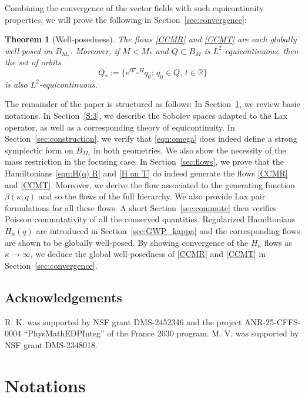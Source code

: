 \documentclass{amsart}
\numberwithin{equation}{section}
\newtheorem{theorem}{Theorem}[section]
\theoremstyle{definition}
\newcommand{\om}{\omega}
\newcommand{\R}{\mathbb{R}}
\newcommand{\na}{\nabla}
\begin{document}
Combining the convergence of the vector fields with such equicontinuity properties, we will prove the following in Section~\ref{sec:convergence}:

\begin{theorem}[Well-posedness]\label{T:GWP}
The flows \eqref{CCMR} and \eqref{CCMT} are each globally well-posed on $B_{M_*}$.   Moreover, if $M<M_*$ and $Q\subset B_M$ is $L^2$-equicontinuous, then the set of orbits
$$
Q_{\ast}:=\bigl\{e^{t\na_\om H}q_0:\,q_0\in Q,\, t\in \R \bigr\}
$$
is also $L^2$-equicontinuous.
\end{theorem}

The remainder of the paper is structured as follows:  In Section~\ref{S:Note}, we review basic notations.  In Section~\ref{S:3}, we describe the Sobolev spaces adapted to the Lax operator, as well as a corresponding theory of equicontinuity.  In Section~\ref{sec:construction}, we verify that \eqref{eqn:omega} does indeed define a strong symplectic form on $B_{M_*}$ in both geometries.  We also show the necessity of the mass restriction in the focusing case.  In Section~\ref{sec:flows}, we prove that the Hamiltonians \eqref{eqn:H(q) R} and \eqref{H on T} do indeed generate the flows \eqref{CCMR} and \eqref{CCMT}.  Moreover, we derive the flow associated to the generating function $\beta(\kappa,q)$ and so the flows of the full hierarchy.  We also provide Lax pair formulations for all these flows.  A short Section~\ref{sec:commute} then verifies Poisson commutativity of all the conserved quantities.  Regularized Hamiltonians $H_\kappa(q)$ are introduced in Section~\ref{sec:GWP_kappa} and the corresponding flows are shown to be globally well-posed.  By showing convergence of the $H_\kappa$ flows as $\kappa\to\infty$, we deduce the global well-posedness of \eqref{CCMR} and \eqref{CCMT} in Section~\ref{sec:convergence}. 

\subsection*{Acknowledgements}
R. K. was supported by NSF grant DMS-2452346 and the project ANR-25-CFFS-0004 ``PhysMathEDPInteg'' of the France 2030 program. M. V. was supported by NSF grant DMS-2348018.



\section{Notations}\label{S:Note}
\end{document}
